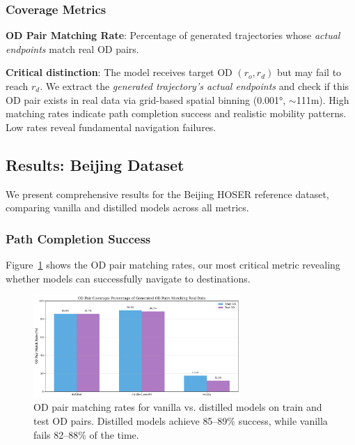\subsubsection{Coverage Metrics}

\textbf{OD Pair Matching Rate}: Percentage of generated trajectories whose \emph{actual endpoints} match real OD pairs.

\textbf{Critical distinction}: The model receives target OD $(r_o, r_d)$ but may fail to reach $r_d$. We extract the \emph{generated trajectory's actual endpoints} and check if this OD pair exists in real data via grid-based spatial binning (0.001°, $\sim$111m). High matching rates indicate path completion success and realistic mobility patterns. Low rates reveal fundamental navigation failures.

\subsection{Results: Beijing Dataset}
\label{sec:eval-beijing}

We present comprehensive results for the Beijing HOSER reference dataset, comparing vanilla and distilled models across all metrics.

\subsubsection{Path Completion Success}

Figure~\ref{fig:od-matching} shows the OD pair matching rates, our most critical metric revealing whether models can successfully navigate to destinations.

\begin{figure}[h]
\centering
\includegraphics[width=0.7\textwidth]{assets/plots/hoser/od_matching_rates.pdf}
\caption{OD pair matching rates for vanilla vs. distilled models on train and test OD pairs. Distilled models achieve 85--89\% success, while vanilla fails 82--88\% of the time.}
\label{fig:od-matching}
\end{figure}

